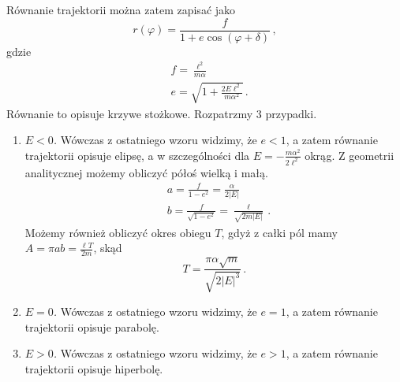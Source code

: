 \documentclass[../main.tex]{subfiles}
\begin{document}
Równanie trajektorii można zatem zapisać jako
\begin{equation*}
    r(\varphi)=\frac{f}{1+e\cos(\varphi+\delta)}\,,
\end{equation*}
gdzie
\begin{equation*}
    \begin{split}
        &f=\frac{\ell^2}{m\alpha}\\
        &e=\sqrt{1+\frac{2E\ell^2}{m\alpha^2}}\,.
    \end{split}
\end{equation*}
Równanie to opisuje krzywe stożkowe. Rozpatrzmy 3 przypadki.
\begin{enumerate}
    \item \textit{\(E<0\).} Wówczas z ostatniego wzoru widzimy, że \(e<1\), a zatem równanie
    trajektorii opisuje elipsę, a w szczególności dla \(E=-\frac{m\alpha^2}{2\ell^2}\) okrąg. Z
    geometrii analitycznej możemy obliczyć półoś wielką i małą.
    \begin{equation*}
    \begin{split}
        &a=\frac{f}{1-e^2}=\frac{\alpha}{2|E|}\\
        &b=\frac{f}{\sqrt{1-e^2}}=\frac{\ell}{\sqrt{2m|E|}}\,.
    \end{split}
    \end{equation*}
    Możemy również obliczyć okres obiegu \(T\), gdyż z całki pól mamy \(A=\pi ab=\frac{\ell
    T}{2m}\), skąd
    \begin{equation*}
        T=\frac{\pi\alpha\sqrt{m}}{\sqrt{2|E|^3}}\,.
    \end{equation*}
    \item \textit{\(E=0\).} Wówczas z ostatniego wzoru widzimy, że \(e=1\), a zatem równanie
    trajektorii opisuje parabolę.
    
    \item \textit{\(E>0\).} Wówczas z ostatniego wzoru widzimy, że \(e>1\), a zatem równanie
    trajektorii opisuje hiperbolę.
\end{enumerate}
\end{document}
